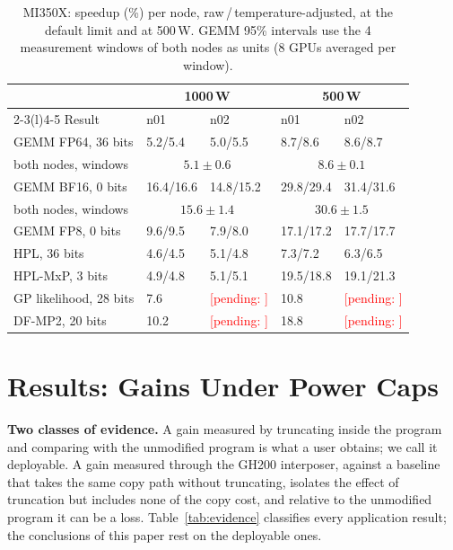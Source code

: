 \documentclass[conference]{IEEEtran}
\newcommand{\W}{\,W}
\newcommand{\pct}{\%}
\newcommand{\pending}[1]{\textcolor{red}{[pending: #1]}}
\begin{document}
\begin{table}[t]
\caption{MI350X: speedup (\%) per node, raw\,/\,temperature-adjusted, at the default limit and at 500\W. GEMM 95\pct{}
intervals use the 4 measurement windows of both nodes as units (8 GPUs averaged per window).}\label{tab:robust}
\centering\footnotesize\setlength{\tabcolsep}{2.5pt}
\begin{tabular}{@{}lllll@{}}
\toprule
& \multicolumn{2}{c}{1000\W} & \multicolumn{2}{c}{500\W} \\
\cmidrule(lr){2-3}\cmidrule(l){4-5}
Result & n01 & n02 & n01 & n02 \\
\midrule
GEMM FP64, 36 bits & 5.2/5.4 & 5.0/5.5 & 8.7/8.6 & 8.6/8.7 \\
\quad both nodes, windows & \multicolumn{2}{c}{$5.1\pm0.6$} & \multicolumn{2}{c}{$8.6\pm0.1$} \\
GEMM BF16, 0 bits & 16.4/16.6 & 14.8/15.2 & 29.8/29.4 & 31.4/31.6 \\
\quad both nodes, windows & \multicolumn{2}{c}{$15.6\pm1.4$} & \multicolumn{2}{c}{$30.6\pm1.5$} \\
GEMM FP8, 0 bits & 9.6/9.5 & 7.9/8.0 & 17.1/17.2 & 17.7/17.7 \\
HPL, 36 bits & 4.6/4.5 & 5.1/4.8 & 7.3/7.2 & 6.3/6.5 \\
HPL-MxP, 3 bits & 4.9/4.8 & 5.1/5.1 & 19.5/18.8 & 19.1/21.3 \\
GP likelihood, 28 bits & 7.6 & \pending{} & 10.8 & \pending{} \\
DF-MP2, 20 bits & 10.2 & \pending{} & 18.8 & \pending{} \\
\bottomrule
\end{tabular}
\end{table}

\section{Results: Gains Under Power Caps}\label{sec:results}

\textbf{Two classes of evidence.} A gain measured by truncating inside the program and comparing with the unmodified
program is what a user obtains; we call it deployable. A gain measured through the GH200 interposer, against a baseline
that takes the same copy path without truncating, isolates the effect of truncation but includes none of the copy
cost, and relative to the unmodified program it can be a loss. Table~\ref{tab:evidence} classifies every application
result; the conclusions of this paper rest on the deployable ones.
\end{document}
